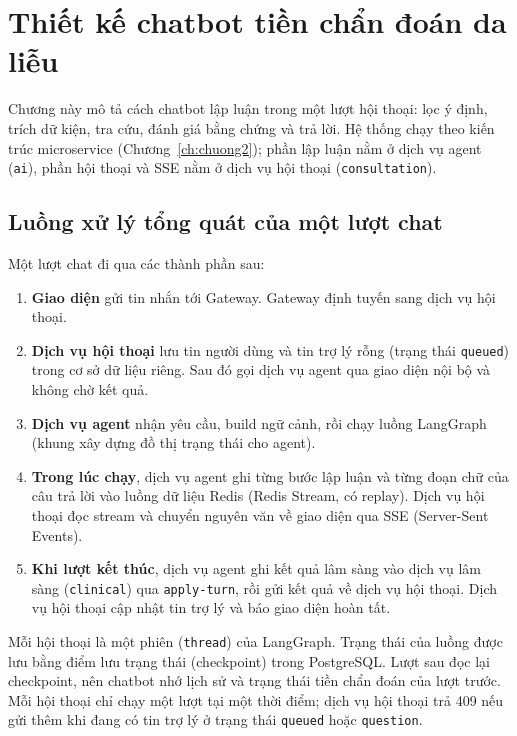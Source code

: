 \chapter[\MakeUppercase{Thiết kế chatbot tiền chẩn đoán da liễu}]{Thiết kế chatbot tiền chẩn đoán da liễu}
\label{ch:chuong5}

Chương này mô tả cách chatbot lập luận trong một lượt hội thoại: lọc ý định, trích dữ kiện, tra cứu, đánh giá bằng chứng và trả lời. Hệ thống chạy theo kiến trúc microservice (Chương~\ref{ch:chuong2}); phần lập luận nằm ở dịch vụ agent (\texttt{ai}), phần hội thoại và SSE nằm ở dịch vụ hội thoại (\texttt{consultation}).

\section{Luồng xử lý tổng quát của một lượt chat}
\label{sec:luong-tong-quat}

Một lượt chat đi qua các thành phần sau:

\begin{enumerate}
  \item \textbf{Giao diện} gửi tin nhắn tới Gateway. Gateway định tuyến sang dịch vụ hội thoại.
  \item \textbf{Dịch vụ hội thoại} lưu tin người dùng và tin trợ lý rỗng (trạng thái \texttt{queued}) trong cơ sở dữ liệu riêng. Sau đó gọi dịch vụ agent qua giao diện nội bộ và không chờ kết quả.
  \item \textbf{Dịch vụ agent} nhận yêu cầu, build ngữ cảnh, rồi chạy luồng LangGraph (khung xây dựng đồ thị trạng thái cho agent).
  \item \textbf{Trong lúc chạy}, dịch vụ agent ghi từng bước lập luận và từng đoạn chữ của câu trả lời vào luồng dữ liệu Redis (Redis Stream, có replay). Dịch vụ hội thoại đọc stream và chuyển nguyên văn về giao diện qua SSE (Server-Sent Events).
  \item \textbf{Khi lượt kết thúc}, dịch vụ agent ghi kết quả lâm sàng vào dịch vụ lâm sàng (\texttt{clinical}) qua \texttt{apply-turn}, rồi gửi kết quả về dịch vụ hội thoại. Dịch vụ hội thoại cập nhật tin trợ lý và báo giao diện hoàn tất.
\end{enumerate}

Mỗi hội thoại là một phiên (\texttt{thread}) của LangGraph. Trạng thái của luồng được lưu bằng điểm lưu trạng thái (checkpoint) trong PostgreSQL. Lượt sau đọc lại checkpoint, nên chatbot nhớ lịch sử và trạng thái tiền chẩn đoán của lượt trước. Mỗi hội thoại chỉ chạy một lượt tại một thời điểm; dịch vụ hội thoại trả 409 nếu gửi thêm khi đang có tin trợ lý ở trạng thái \texttt{queued} hoặc \texttt{question}.

